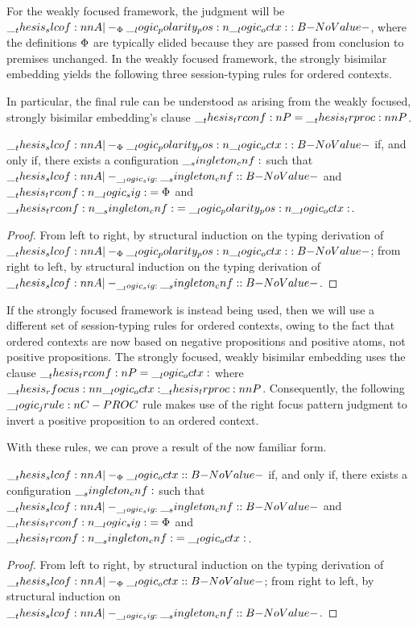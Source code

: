 For the weakly focused framework, the judgment will be $\slcof{A |-_{\orsig} \p{\octx} : B}$, where the definitions $\Phi$ are typically elided because they are passed from conclusion to premises unchanged.
In the weakly focused framework, the strongly bisimilar embedding yields the following three session-typing rules for ordered contexts.
In particular, the final rule can be understood as arising from the weakly focused, strongly bisimilar embedding's clause $\trconf{P} = \trproc{P}$.

\begin{theorem}
  $\slcof{A |-_{\orsig} \p{\octx} : B}$ if, and only if, there exists a configuration $\__singleton_cnf:$ such that $\slcof{A |-_{\sig} \cnf : B}$ and $\__thesis_trconf:n {\__logic_sig:} = \Phi$ and $\__thesis_trconf:n {\__singleton_cnf:} = \__logic_polarity_pos:n {\__logic_octx:}$.
\end{theorem}
\begin{proof}
  From left to right, by structural induction on the typing derivation of $\slcof{A |-_{\orsig} \p{\octx} : B}$;
  from right to left, by structural induction on the typing derivation of $\slcof{A |-_{\sig} \cnf : B}$.
\end{proof}

If the strongly focused framework is instead being used, then we will use a different set of session-typing rules for ordered contexts, owing to the fact that ordered contexts are now based on negative propositions and positive atoms, not positive propositions.
The strongly focused, weakly bisimilar embedding uses the clause $\__thesis_trconf:n {P} = \__logic_octx:$ where $\rfocus{\octx}{\trproc{P}}$.
Consequently, the following $\__logic_jrule:n {C-PROC}$ rule makes use of the right focus pattern judgment to invert a positive proposition to an ordered context.
With these rules, we can prove a result of the now familiar form.
\begin{theorem}
  $\slcof{A |-_{\orsig} \octx : B}$ if, and only if, there exists a configuration $\__singleton_cnf:$ such that $\slcof{A |-_{\sig} \cnf : B}$ and $\__thesis_trconf:n {\__logic_sig:} = \Phi$ and $\__thesis_trconf:n {\__singleton_cnf:} = \__logic_octx:$.
\end{theorem}
\begin{proof}
  From left to right, by structural induction on the typing derivation of $\slcof{A |-_{\orsig} \octx : B}$;
  from right to left, by structural induction on $\slcof{A |-_{\sig} \cnf : B}$.
\end{proof}


